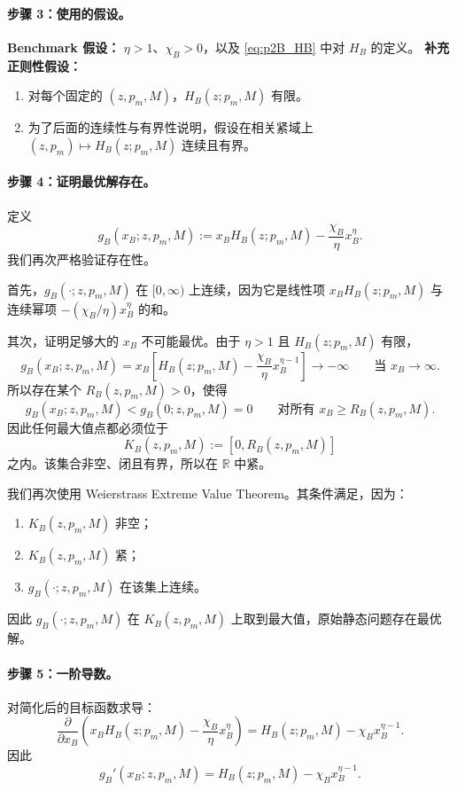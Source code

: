 \paragraph{步骤 3：使用的假设。}
\textbf{Benchmark 假设：} $\eta>1$、$\chi_B>0$，以及 \eqref{eq:p2B_HB} 中对 $H_B$ 的定义。  
\textbf{补充正则性假设：}
\begin{enumerate}
    \item[(B1)] 对每个固定的 $(z,p_m,M)$，$H_B(z;p_m,M)$ 有限。
    \item[(B2)] 为了后面的连续性与有界性说明，假设在相关紧域上 $(z,p_m)\mapsto H_B(z;p_m,M)$ 连续且有界。
\end{enumerate}

\paragraph{步骤 4：证明最优解存在。}
定义
\[
g_B(x_B;z,p_m,M):=x_BH_B(z;p_m,M)-\frac{\chi_B}{\eta}x_B^\eta.
\]
我们再次严格验证存在性。

首先，$g_B(\cdot;z,p_m,M)$ 在 $[0,\infty)$ 上连续，因为它是线性项 $x_BH_B(z;p_m,M)$ 与连续幂项 $-(\chi_B/\eta)x_B^\eta$ 的和。

其次，证明足够大的 $x_B$ 不可能最优。由于 $\eta>1$ 且 $H_B(z;p_m,M)$ 有限，
\[
g_B(x_B;z,p_m,M)
=
 x_B\left[H_B(z;p_m,M)-\frac{\chi_B}{\eta}x_B^{\eta-1}\right]\to -\infty
\qquad\text{当 }x_B\to\infty.
\]
所以存在某个 $R_B(z,p_m,M)>0$，使得
\[
g_B(x_B;z,p_m,M)<g_B(0;z,p_m,M)=0
\qquad\text{对所有 }x_B\ge R_B(z,p_m,M).
\]
因此任何最大值点都必须位于
\[
K_B(z,p_m,M):=[0,R_B(z,p_m,M)]
\]
之内。该集合非空、闭且有界，所以在 $\mathbb R$ 中紧。

我们再次使用 Weierstrass Extreme Value Theorem。其条件满足，因为：
\begin{enumerate}
    \item $K_B(z,p_m,M)$ 非空；
    \item $K_B(z,p_m,M)$ 紧；
    \item $g_B(\cdot;z,p_m,M)$ 在该集上连续。
\end{enumerate}
因此 $g_B(\cdot;z,p_m,M)$ 在 $K_B(z,p_m,M)$ 上取到最大值，原始静态问题存在最优解。

\paragraph{步骤 5：一阶导数。}
对简化后的目标函数求导：
\[
\frac{\partial}{\partial x_B}
\left(
 x_BH_B(z;p_m,M)-\frac{\chi_B}{\eta}x_B^\eta
\right)
=
H_B(z;p_m,M)-\chi_Bx_B^{\eta-1}.
\]
因此
\begin{equation}
g_B'(x_B;z,p_m,M)=H_B(z;p_m,M)-\chi_Bx_B^{\eta-1}.
\label{eq:p2B_derivative}
\end{equation}

